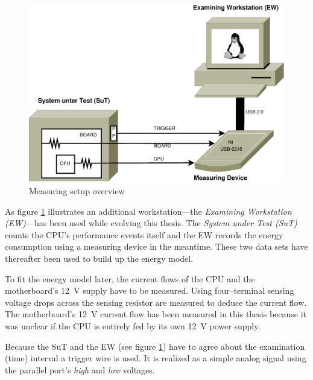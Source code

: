 \label{sec:design}


\label{sec:big-pic}

\begin{figure}
  \centering
    \includegraphics[width=\textwidth]{fig/measuring-overview.eps}
  \caption{Measuring setup overview}
  \label{fig:overview}
\end{figure}

As figure \ref{fig:overview} illustrates an additional workstation---the
\emph{Examining Workstation (EW)}---has been used while evolving this thesis.
The \emph{System under Test (SuT)} counts the CPU's performance events itself
and the EW records the energy consumption using a measuring device in the
meantime. These two data sets have thereafter been used to build up the energy
model.


\label{sec:measuring-setup}

To fit the energy model later, the current flows of the CPU and the
motherboard's \SI{12}{\volt} supply have to be measured. Using four--terminal
sensing \cite{wiki:FTS} voltage drops across the sensing resistor are
measured to deduce the current flow. The motherboard's \SI{12}{\volt} current
flow has been measured in this thesis because it was unclear if the CPU is
entirely fed by its own \SI{12}{\volt} power supply.

Because the SuT and the EW (see figure \ref{fig:overview}) have to agree about
the examination (time) interval a trigger wire is used. It is realized as a
simple analog signal using the parallel port's \emph{high} and \emph{low}
voltages.

